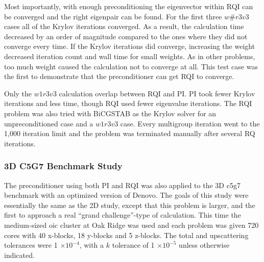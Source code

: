 Most importantly, with enough preconditioning the eigenvector within RQI can be converged and the right eigenpair can be found. For the first three $w\#r3v3$ cases all of the Krylov iterations converged. As a result, the calculation time decreased by an order of magnitude compared to the ones where they did not converge every time. If the Krylov iterations did converge, increasing the weight decreased iteration count and wall time for small weights. As in other problems, too much weight caused the calculation not to converge at all. This test case was the first to demonstrate that the preconditioner can get RQI to converge. 

Only the $w1r3v3$ calculation overlap between RQI and PI. PI took fewer Krylov iterations and less time, though RQI used fewer eigenvalue iterations. The RQI problem was also tried with BiCGSTAB as the Krylov solver for an unpreconditioned case and a $w1r3v3$ case. Every multigroup iteration went to the 1,000 iteration limit and the problem was terminated manually after several RQ iterations.

 \subsubsection{3D C5G7 Benchmark Study}
The preconditioner using both PI and RQI was also applied to the 3D c5g7 benchmark with an optimized version of Denovo. The goals of this study were essentially the same as the 2D study, except that this problem is larger, and the first to approach a real ``grand challenge''-type of calculation. This time the medium-sized oic cluster at Oak Ridge was used and each problem was given 720 cores with 40 x-blocks, 18 y-blocks and 5 z-blocks. The total and upscattering tolerances were 1 $\times 10^{-4}$, with a $k$ tolerance of 1 $\times 10^{-5}$ unless otherwise indicated. 

